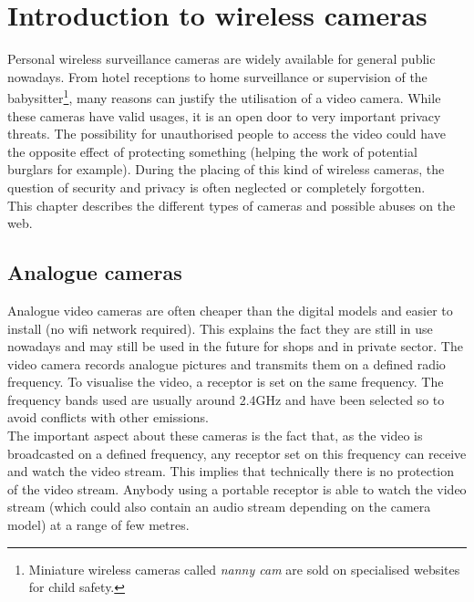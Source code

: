 \chapter{Introduction to wireless cameras}
\label{chap:wifi-cam}


Personal wireless surveillance cameras are widely available for general public nowadays.
From hotel receptions to home surveillance or supervision of the babysitter\footnote{Miniature wireless cameras called \emph{nanny cam} are sold on specialised websites for child safety.}, many reasons can justify the utilisation of a video camera.
While these cameras have valid usages, it is an open door to very important privacy threats.
The possibility for unauthorised people to access the video could have the opposite effect of protecting something (helping the work of potential burglars for example).
During the placing of this kind of wireless cameras, the question of security and privacy is often neglected or completely forgotten.\\

This chapter describes the different types of cameras and possible abuses on the web.

\section{Analogue cameras}
\label{sec:cam-analogic}

Analogue video cameras are often cheaper than the digital models and easier to install (no wifi network required).
This explains the fact they are still in use nowadays and may still be used in the future for shops and in private sector.
The video camera records analogue pictures and transmits them on a defined radio frequency.
To visualise the video, a receptor is set on the same frequency.
The frequency bands used are usually around 2.4GHz and have been selected so to avoid conflicts with other emissions.\\

The important aspect about these cameras is the fact that, as the video is broadcasted on a defined frequency, any receptor set on this frequency can receive and watch the video stream.
This implies that technically there is no protection of the video stream.
Anybody using a portable receptor is able to watch the video stream (which could also contain an audio stream depending on the camera model) at a range of few metres.\\

